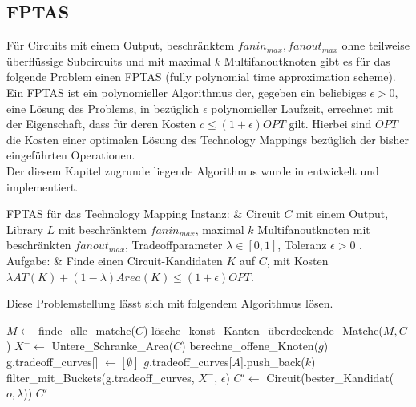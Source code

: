 \documentclass[11pt, a4paper, german]{article}
\newcommand{\TM}{Technology  Mapping }
\begin{document}
\subsection{FPTAS}
\label{subsec:fptas}
Für Circuits mit einem Output, beschränktem $fanin_{max}, fanout_{max}$ ohne teilweise überflüssige Subcircuits und mit maximal $k$ Multifanoutknoten gibt es für das folgende Problem einen FPTAS (fully polynomial time approximation scheme). Ein FPTAS ist ein polynomieller Algorithmus der, gegeben ein beliebiges $\epsilon > 0$, eine Lösung des Problems, in bezüglich $\epsilon$  polynomieller Laufzeit, errechnet mit der Eigenschaft, dass für deren Kosten $c \leq (1+\epsilon)OPT$ gilt. Hierbei sind $OPT$ die Kosten einer optimalen Lösung des Technology Mappings bezüglich der bisher eingeführten Operationen.\\
Der diesem Kapitel zugrunde liegende Algorithmus wurde in \cite{Elbert} entwickelt und implementiert. 
 \begin{problem}[framed]{FPTAS für das \TM}
  Instanz:  & Circuit $C$ mit einem Output, Library $L$ mit beschr\"anktem $fanin_{max}$, maximal $k$ Multifanoutknoten mit beschränkten $fanout_{max}$, Tradeoffparameter $\lambda \in [0,1]$, Toleranz $\epsilon > 0$ .\\
  Aufgabe: &  Finde einen Circuit-Kandidaten $K$ auf $C$, mit Kosten $\lambda AT(K) + (1-\lambda)Area(K) \leq (1+\epsilon)OPT$.
\end{problem}
Diese Problemstellung lässt sich mit folgendem Algorithmus lösen.\\

\LinesNumbered
\begin{algorithm}[H]
\DontPrintSemicolon
\caption{FPTAS f\"ur das TM mit Konvexkombination}

   $M \gets$ finde\_alle\_matche($C$)\;
   lösche\_konst\_Kanten\_überdeckende\_Matche($M, C$)\;
   $X^- \gets$ Untere\_Schranke\_Area($C$)\;
        {
			berechne\_offene\_Knoten($g$)\;	 
        }
  {
    g.tradeoff\_curves[] $\gets [\emptyset]$\;
    {
      {
        {
        	 {
			$g$.tradeoff\_curves[$A$].push\_back($k$)\;      	 
        	 }  
        }
      }
    }
    filter\_mit\_Buckets(g.tradeoff\_curves, $X^-$, $\epsilon$)\;
  }
  $C' \gets $ Circuit(bester\_Kandidat($o, \lambda$))\;
  \Return $C'$\;
\end{algorithm}\ \\
\end{document}
